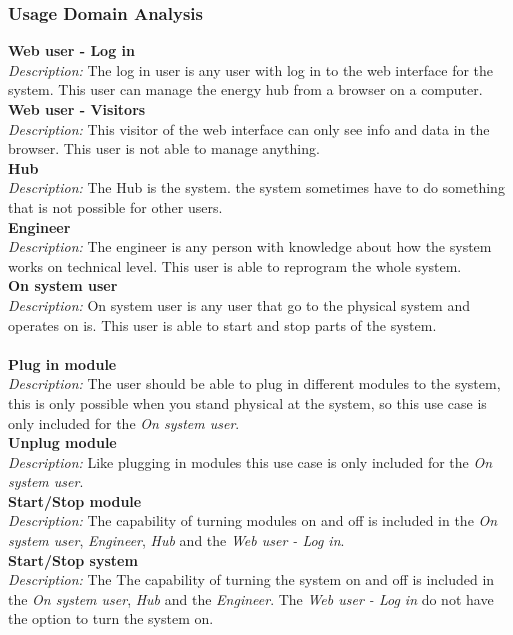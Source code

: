 	\subsubsection{Usage Domain Analysis}
		\textbf{Web user - Log in}
		\\\textit{Description: }
		The log in user is any user with log in to the web interface for the system. This user can manage the energy hub from a browser on a computer.
		\\\textbf{Web user - Visitors}
		\\\textit{Description: }
		This visitor of the web interface can only see info and data in the browser. This user is not able to manage anything.
		\\\textbf{Hub}
		\\\textit{Description: }
		The Hub is the system. the system sometimes have to do something that is not possible for other users.
		\\\textbf{Engineer}
		\\\textit{Description: }
		The engineer is any person with knowledge about how the system works on technical level. This user is able to reprogram the whole system.
		\\\textbf{On system user}
		\\\textit{Description: }
		On system user is any user that go to the physical system and operates on is. This user is able to start and stop parts of the system.
		\\\\\textbf{Plug in module}
		\\\textit{Description: }
		The user should be able to plug in different modules to the system, this is only possible when you stand physical at the system, so this use case is only included for the \textit{On system user}.
		\\\textbf{Unplug module}
		\\\textit{Description: }
		Like plugging in modules this use case is only included for the \textit{On system user}.
		\\\textbf{Start/Stop module}
		\\\textit{Description: }
		The capability of turning modules on and off is included in the \textit{On system user}, \textit{Engineer}, \textit{Hub} and the \textit{Web user - Log in}.
		\\\textbf{Start/Stop system}
		\\\textit{Description: }
		The The capability of turning the system on and off is included in the \textit{On system user}, \textit{Hub} and the \textit{Engineer}. The \textit{Web user - Log in} do not have the option to turn the system on.
